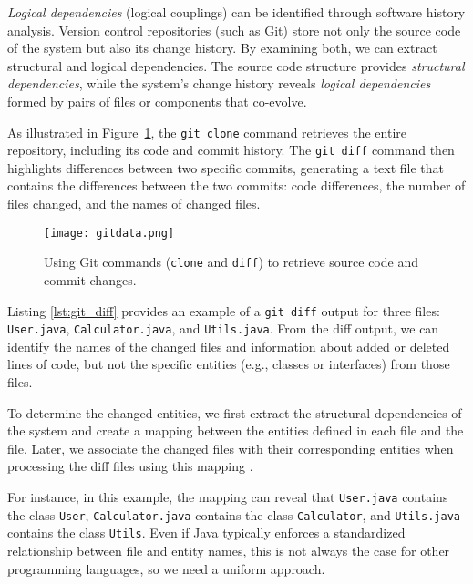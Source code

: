 \hspace{4em}\textit{Logical dependencies} (logical couplings) can be identified through software history analysis. Version control repositories (such as Git) store not only the source code of the system but also its change history. By examining both, we can extract structural and logical dependencies. The source code structure provides \textit{structural dependencies}, while the system’s change history reveals \textit{logical dependencies} formed by pairs of files or components that co-evolve.

As illustrated in Figure~\ref{fig:extracting_data_with_git}, the \texttt{git clone} command retrieves the entire repository, including its code and commit history. The \texttt{git diff} command then highlights differences between two specific commits, generating a text file that contains the differences between the two commits: code differences, the number of files changed, and the names of changed files.

\begin{figure}[H]
\centering
\texttt{[image: gitdata.png]}
\caption{Using Git commands (\texttt{clone} and \texttt{diff}) to retrieve source code and commit changes.}
\label{fig:extracting_data_with_git}
\end{figure}


Listing \ref{lst:git_diff} provides an example of a \texttt{git diff} output for three files: \texttt{User.java}, \texttt{Calculator.java}, and \texttt{Utils.java}. From the diff output, we can identify the names of the changed files and information about added or deleted lines of code, but not the specific entities (e.g., classes or interfaces) from those files. 

To determine the changed entities, we first extract the structural dependencies of the system and create a mapping between the entities defined in each file and the file. Later, we associate the changed files with their corresponding entities when processing the diff files using this mapping \cite{DepSACI, b4, icstcc-2024, enase19}. 

For instance, in this example, the mapping can reveal that \texttt{User.java} contains the class \texttt{User}, \texttt{Calculator.java} contains the class \texttt{Calculator}, and \texttt{Utils.java} contains the class \texttt{Utils}. Even if Java typically enforces a standardized relationship between file and entity names, this is not always the case for other programming languages, so we need a uniform approach.

